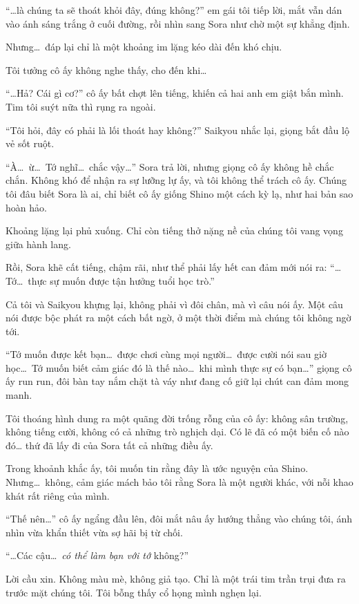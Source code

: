 \documentclass[../main.tex]{subfiles}
\begin{document}
``\dots là chúng ta sẽ thoát khỏi đây, đúng không?'' em gái tôi tiếp lời, mắt vẫn dán vào ánh sáng trắng ở cuối đường, rồi nhìn sang Sora như chờ một sự khẳng định.

Nhưng\dots\ đáp lại chỉ là một khoảng im lặng kéo dài đến khó chịu.

Tôi tưởng cô ấy không nghe thấy, cho đến khi\dots

``\dots Hả? Cái gì cơ?'' cô ấy bất chợt lên tiếng, khiến cả hai anh em giật bắn mình. Tim tôi suýt nữa thì rụng ra ngoài.

``Tôi hỏi, đây có phải là lối thoát hay không?'' Saikyou nhắc lại, giọng bắt đầu lộ vẻ sốt ruột.

``À\dots\ ừ\dots\ Tớ nghĩ\dots\ chắc vậy\dots'' Sora trả lời, nhưng giọng cô ấy không hề chắc chắn. Không khó để nhận ra sự lưỡng lự ấy, và tôi không thể trách cô ấy. Chúng tôi đâu biết Sora là ai, chỉ biết cô ấy giống Shino một cách kỳ lạ, như hai bản sao hoàn hảo.

Khoảng lặng lại phủ xuống. Chỉ còn tiếng thở nặng nề của chúng tôi vang vọng giữa hành lang.

Rồi, Sora khẽ cất tiếng, chậm rãi, như thể phải lấy hết can đảm mới nói ra: ``\dots Tớ\dots\ thực sự muốn được tận hưởng tuổi học trò.''

Cả tôi và Saikyou khựng lại, không phải vì đôi chân, mà vì câu nói ấy. Một câu nói được bộc phát ra một cách bất ngờ, ở một thời điểm mà chúng tôi không ngờ tới.

``Tớ muốn được kết bạn\dots\ được chơi cùng mọi người\dots\ được cười nói sau giờ học\dots\ Tớ muốn biết cảm giác đó là thế nào\dots\ khi mình thực sự có bạn\dots'' giọng cô ấy run run, đôi bàn tay nắm chặt tà váy như đang cố giữ lại chút can đảm mong manh.

Tôi thoáng hình dung ra một quãng đời trống rỗng của cô ấy: không sân trường, không tiếng cười, không có cả những trò nghịch dại. Có lẽ đã có một biến cố nào đó… thứ đã lấy đi của Sora tất cả những điều ấy.

Trong khoảnh khắc ấy, tôi muốn tin rằng đây là ước nguyện của Shino. Nhưng\dots\ không, cảm giác mách bảo tôi rằng Sora là một người khác, với nỗi khao khát rất riêng của mình.

``Thế nên\dots'' cô ấy ngẩng đầu lên, đôi mắt nâu ấy hướng thẳng vào chúng tôi, ánh nhìn vừa khẩn thiết vừa sợ hãi bị từ chối.

``\dots Các cậu\dots\ \emph{có thể làm bạn với tớ} không?''

Lời cầu xin. Không màu mè, không giả tạo. Chỉ là một trái tim trần trụi đưa ra trước mặt chúng tôi. Tôi bỗng thấy cổ họng mình nghẹn lại.
\end{document}
